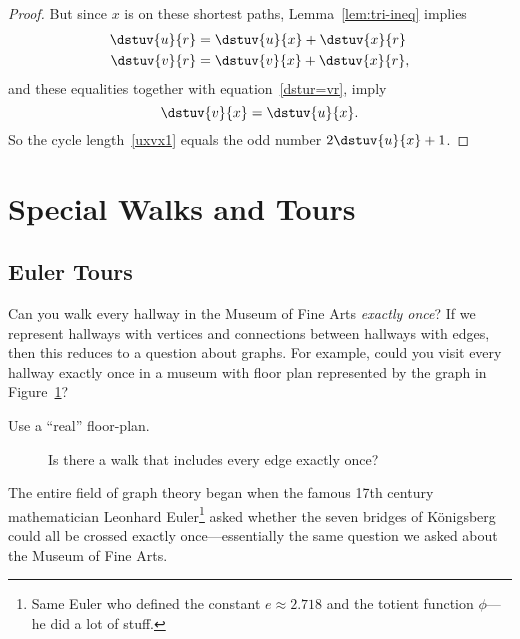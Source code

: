\begin{editingnotes}
\begin{proof}
But since $x$ is on these shortest paths, Lemma~\ref{lem:tri-ineq} implies
\begin{align*}
\dstuv{u}{r} & = \dstuv{u}{x} + \dstuv{x}{r}\\
\dstuv{v}{r} & = \dstuv{v}{x} + \dstuv{x}{r},
\end{align*}
and these equalities together with equation~\eqref{dstur=vr},
imply
\[
\dstuv{v}{x} = \dstuv{u}{x}.
\]
So the cycle length~\ref{uxvx1} equals the odd number $2\dstuv{u}{x}+1$.
\end{proof}
\end{editingnotes}

\iffalse
Theorem~\ref{thm:2-colorable-equiv} turns out to be useful, since
bipartite graphs come up fairly often in practice.\footnote{One
  example concerning routing networks already came up in
  Lemma~\ref{deg1-union}.  Corollary~\ref{cor:K33-nonplanar} reveals
  the importance of another example in planar graph theory.}
\fi

\section{Special Walks and Tours}

\subsection{Euler Tours}
 Can you walk every hallway in the Museum of Fine Arts \emph{exactly
   once}?  If we represent hallways with vertices and connections
 between hallways with edges, then this reduces to a question about
 graphs.  For example, could you visit every hallway exactly once in a
 museum with floor plan represented by the graph in
 Figure~\ref{fig:5BC}?

\begin{editingnotes}
Use a ``real'' floor-plan.
\end{editingnotes}

\begin{figure}
\caption{Is there a walk that includes every edge exactly once?}
\label{fig:5BC}
\end{figure}

The entire field of graph theory began when the famous 17th century
mathematician Leonhard Euler\footnote{Same Euler who defined the
  constant $e\approx 2.718$ and the totient function $\phi$---he did a
  lot of stuff.} asked whether the seven bridges of K\"onigsberg could
all be crossed exactly once---essentially the same question we asked
about the Museum of Fine Arts.

